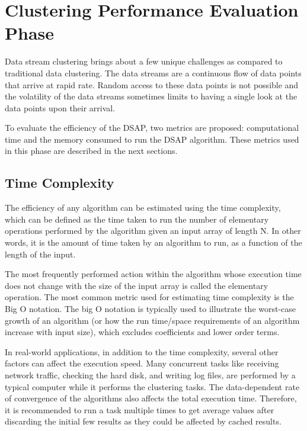 \documentclass[../UNBThesis2.tex]{subfiles}
\begin{document}
\section{Clustering Performance Evaluation Phase}

Data stream clustering brings about a few unique challenges as compared to traditional data clustering. The data streams are a continuous flow of data points that arrive at rapid rate. Random access to these data points is not possible and the volatility of the data streams sometimes limits to having a single look at the data points upon their arrival. 


To evaluate the efficiency of the DSAP, two metrics are proposed: computational time and the memory consumed to run the DSAP algorithm. These metrics used in this phase are described in the next sections.

\subsection{Time Complexity}

The efficiency of any algorithm can be estimated using the time complexity, which can be defined as the time taken to run the number of elementary operations performed by the algorithm given an input array of length N. In other words, it is the amount of time taken by an algorithm to run, as a function of the length of the input.  

The most frequently performed action within the algorithm whose execution time does not change with the size of the input array is called the elementary operation. The most common metric used for estimating time complexity is the Big O notation. The big O notation is typically used to illustrate the worst-case growth of an algorithm (or how the run time/space requirements of an algorithm increase with input size), which excludes coefficients and lower order terms.

In real-world applications, in addition to the time complexity, several other factors can affect the execution speed. Many concurrent tasks like receiving network traffic, checking the hard disk, and writing log files, are performed by a typical computer while it performs the clustering tasks. The data-dependent rate of convergence of the algorithms also affects the total execution time. Therefore, it is recommended to run a task multiple times to get average values after discarding the initial few results as they could be affected by cached results. %
\end{document}
